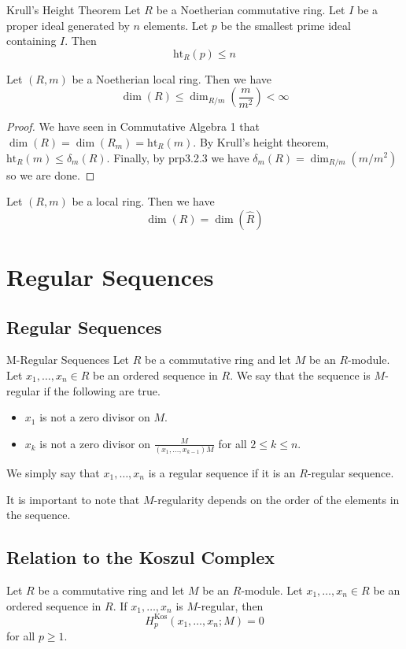 \documentclass[a4paper]{article}
\begin{document}
\begin{thm}{Krull's Height Theorem}{} Let $R$ be a Noetherian commutative ring. Let $I$ be a proper ideal generated by $n$ elements. Let $p$ be the smallest prime ideal containing $I$. Then $$\text{ht}_R(p)\leq n$$
\end{thm}

\begin{prp}{}{} Let $(R,m)$ be a Noetherian local ring. Then we have $$\dim(R)\leq\dim_{R/m}\left(\frac{m}{m^2}\right)<\infty$$ \tcbline
\begin{proof}
We have seen in Commutative Algebra 1 that $\dim(R)=\dim(R_m)=\text{ht}_R(m)$. By Krull's height theorem, $\text{ht}_R(m)\leq\delta_m(R)$. Finally, by prp3.2.3 we have $\delta_m(R)=\dim_{R/m}(m/m^2)$ so we are done. 
\end{proof}
\end{prp}

\begin{prp}{}{} Let $(R,m)$ be a local ring. Then we have $$\dim(R)=\dim(\widehat{R})$$
\end{prp}

\pagebreak
\section{Regular Sequences}
\subsection{Regular Sequences}
\begin{defn}{M-Regular Sequences}{} Let $R$ be a commutative ring and let $M$ be an $R$-module. Let $x_1,\dots,x_n\in R$ be an ordered sequence in $R$. We say that the sequence is $M$-regular if the following are true. 
\begin{itemize}
\item $x_1$ is not a zero divisor on $M$. 
\item $x_k$ is not a zero divisor on $\frac{M}{(x_1,\dots,x_{k-1})M}$ for all $2\leq k\leq n$. 
\end{itemize}
We simply say that $x_1,\dots,x_n$ is a regular sequence if it is an $R$-regular sequence. 
\end{defn}

It is important to note that $M$-regularity depends on the order of the elements in the sequence. 

\subsection{Relation to the Koszul Complex}
\begin{thm}{}{} Let $R$ be a commutative ring and let $M$ be an $R$-module. Let $x_1,\dots,x_n\in R$ be an ordered sequence in $R$. If $x_1,\dots,x_n$ is $M$-regular, then $$H_p^\text{Kos}(x_1,\dots,x_n;M)=0$$ for all $p\geq 1$. 
\end{thm}
\end{document}
